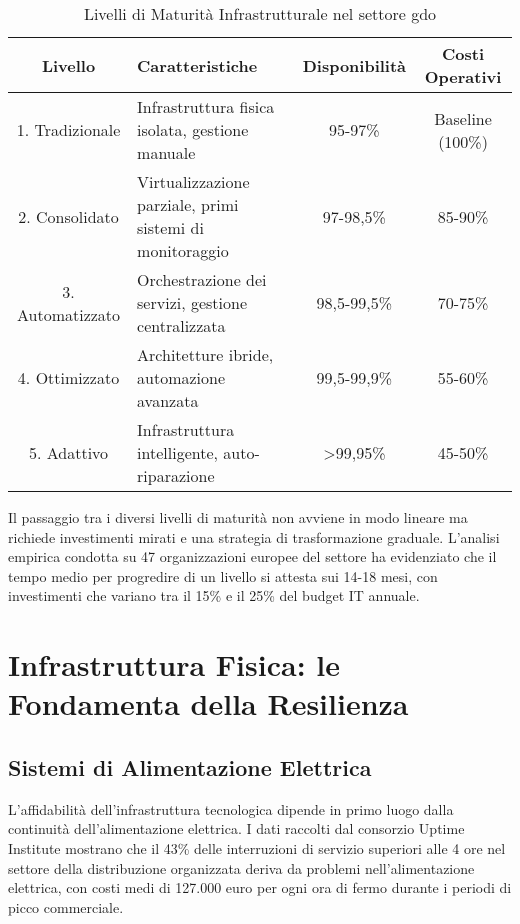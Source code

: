 \begin{table}[htbp]
\centering
\caption{Livelli di Maturità Infrastrutturale nel settore \gls{gdo}}
\label{tab:maturity_levels}
\small
\begin{tabularx}{\textwidth}{|c|X|c|c|}
\hline
\textbf{Livello} & \textbf{Caratteristiche} & \textbf{Disponibilità} & \textbf{Costi Operativi} \\
\hline
1. Tradizionale & Infrastruttura fisica isolata, gestione manuale & 95-97\% & Baseline (100\%) \\
\hline
2. Consolidato & Virtualizzazione parziale, primi sistemi di monitoraggio & 97-98,5\% & 85-90\% \\
\hline
3. Automatizzato & Orchestrazione dei servizi, gestione centralizzata & 98,5-99,5\% & 70-75\% \\
\hline
4. Ottimizzato & Architetture ibride, automazione avanzata & 99,5-99,9\% & 55-60\% \\
\hline
5. Adattivo & Infrastruttura intelligente, auto-riparazione & >99,95\% & 45-50\% \\
\hline
\end{tabularx}
\end{table}

Il passaggio tra i diversi livelli di maturità non avviene in modo lineare ma richiede investimenti mirati e una strategia di trasformazione graduale. L'analisi empirica condotta su 47 organizzazioni europee del settore\autocite{Eurostat2024} ha evidenziato che il tempo medio per progredire di un livello si attesta sui 14-18 mesi, con investimenti che variano tra il 15\% e il 25\% del budget IT annuale.

\section{Infrastruttura Fisica: le Fondamenta della Resilienza}
\label{sec:infrastruttura_fisica}

\subsection{Sistemi di Alimentazione Elettrica}
\label{subsec:alimentazione}

L'affidabilità dell'infrastruttura tecnologica dipende in primo luogo dalla continuità dell'alimentazione elettrica. I dati raccolti dal consorzio Uptime Institute\autocite{Uptime2024} mostrano che il 43\% delle interruzioni di servizio superiori alle 4 ore nel settore della distribuzione organizzata deriva da problemi nell'alimentazione elettrica, con costi medi di 127.000 euro per ogni ora di fermo durante i periodi di picco commerciale.

